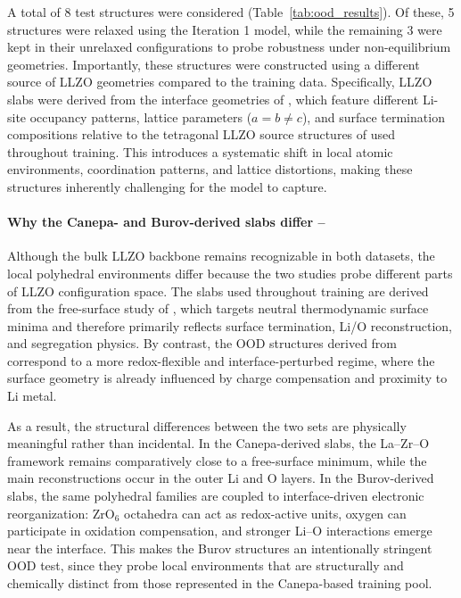 \documentclass[12pt,a4paper,oneside]{book}
\begin{document}
A total of 8 test structures were considered (Table~\ref{tab:ood_results}). Of these, 5 structures were relaxed using the Iteration 1 model, while the remaining 3 were kept in their unrelaxed configurations to probe robustness under non-equilibrium geometries. Importantly, these structures were constructed using a different source of LLZO geometries compared to the training data. Specifically, LLZO slabs were derived from the interface geometries of
\citeauthor{Burov2024LiLLZOChargeTransfer}, which feature different Li-site
occupancy patterns, lattice parameters ($a = b \neq c$), and surface
termination compositions relative to the tetragonal LLZO source structures
of \citeauthor{Canepa2018LLZO} used throughout training. This introduces a systematic shift in local atomic environments, coordination patterns, and lattice distortions, making these structures inherently challenging for the model to capture.

\paragraph{Why the Canepa- and Burov-derived slabs differ --}
Although the bulk LLZO backbone remains recognizable in both datasets, the local
polyhedral environments differ because the two studies probe different parts of
LLZO configuration space. The slabs used throughout training are derived from the
free-surface study of \citeauthor{Canepa2018LLZO}, which targets neutral
thermodynamic surface minima and therefore primarily reflects surface termination,
Li/O reconstruction, and segregation physics. By contrast, the OOD structures
derived from \citeauthor{Burov2024LiLLZOChargeTransfer} correspond to a more
redox-flexible and interface-perturbed regime, where the surface geometry is
already influenced by charge compensation and proximity to Li metal.

As a result, the structural differences between the two sets are physically
meaningful rather than incidental. In the Canepa-derived slabs, the La--Zr--O
framework remains comparatively close to a free-surface minimum, while the main
reconstructions occur in the outer Li and O layers. In the Burov-derived slabs,
the same polyhedral families are coupled to interface-driven electronic
reorganization: ZrO$_6$ octahedra can act as redox-active units, oxygen can
participate in oxidation compensation, and stronger Li--O interactions emerge
near the interface. This makes the Burov structures an intentionally stringent
OOD test, since they probe local environments that are structurally and
chemically distinct from those represented in the Canepa-based training pool.
\end{document}
